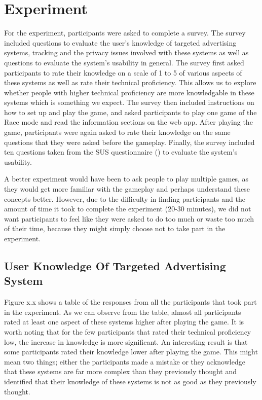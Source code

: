 \documentclass{l4proj}
\begin{document}
\section{Experiment}
For the experiment, participants were asked to complete a survey. The survey included questions to evaluate the user's knowledge of targeted advertising systems, tracking and the privacy issues involved with these systems as well as questions to evaluate the system's usability in general. The survey first asked participants to rate their knowledge on a scale of 1 to 5 of various aspects of these systems as well as rate their technical proficiency. This allows us to explore whether people with higher technical proficiency are more knowledgable in these systems which is something we expect. The survey then included instructions on how to set up and play the game, and asked participants to play one game of the Race mode and read the information sections on the web app. After playing the game, participants were again asked to rate their knowledge on the same questions that they were asked before the gameplay. Finally, the survey included ten questions taken from the SUS questionnaire (\cite{sus}) to evaluate the system's usability.

A better experiment would have been to ask people to play multiple games, as they would get more familiar with the gameplay and perhaps understand these concepts better. However, due to the difficulty in finding participants and the amount of time it took to complete the experiment (20-30 minutes), we did not want participants to feel like they were asked to do too much or waste too much of their time, because they might simply choose not to take part in the experiment.

\subsection{User Knowledge Of Targeted Advertising System}
Figure x.x shows a table of the responses from all the participants that took part in the experiment. As we can observe from the table, almost all participants rated at least one aspect of these systems higher after playing the game. It is worth noting that for the few participants that rated their technical proficiency low, the increase in knowledge is more significant. An interesting result is that some participants rated their knowledge lower after playing the game. This might mean two things; either the participants made a mistake or they acknowledge that these systems are far more complex than they previously thought and identified that their knowledge of these systems is not as good as they previously thought.
\end{document}
